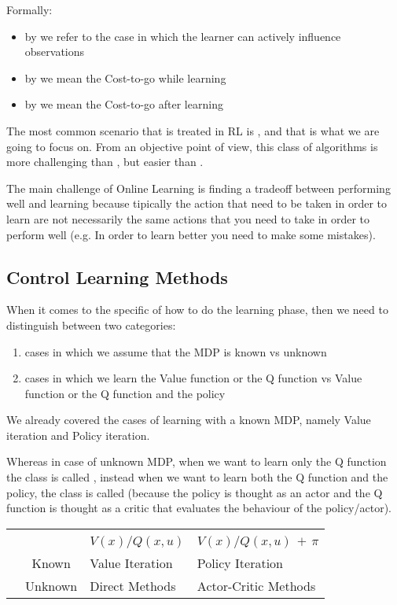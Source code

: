 Formally:
\begin{itemize}
\item by  we refer to the case in which the learner can actively influence observations
\item by  we mean the Cost-to-go while learning
\item by  we mean the Cost-to-go after learning
\end{itemize}

The most common scenario that is treated in RL is , and that is what we are going to focus on. From an objective point of view, this class of algorithms is more challenging than , but easier than .

The main challenge of Online Learning is finding a tradeoff between performing well and learning because tipically the action that need to be taken in order to learn are not necessarily the same actions that you need to take in order to perform well (e.g. In order to learn better you need to make some mistakes).

\subsection{Control Learning Methods}
When it comes to the specific of how to do the learning phase, then we need to distinguish between two categories:
\begin{enumerate}
\item cases in which we assume that the MDP is known vs unknown
\item cases in which we learn the Value function or the Q function vs Value function or the Q function and the policy
\end{enumerate}
We already covered the cases of learning with a known MDP, namely Value iteration and Policy iteration.

Whereas in case of unknown MDP, when we want to learn only the Q function the class is called , instead when we want to learn both the Q function and the policy, the class is called  (because the policy is thought as an actor and the Q function is thought as a critic that evaluates the behaviour of the policy/actor).

\begin{table}[!h]
\centering
\begin{NiceTabular}{ccW{c}{5cm}W{c}{5cm}}
&  & \\
&&$V(x) / Q(x,u)$&$V(x) / Q(x,u) \,+ \, \pi$\\
 \rule[-0.5cm]{0pt}{1.2cm}  & Known & Value Iteration & Policy Iteration\\
 \rule[-0.5cm]{0pt}{1.2cm} &Unknown&Direct Methods&Actor-Critic Methods 
 \end{NiceTabular}
\end{table}

